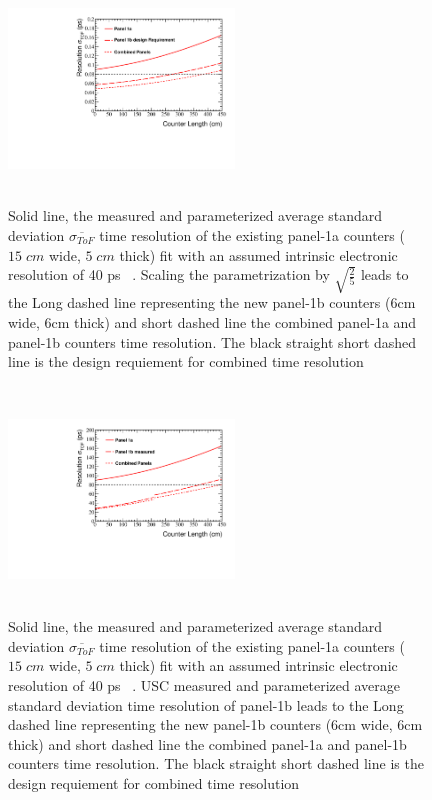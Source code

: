 \begin{figure}[h!]
\centerline{\includegraphics[width=6cm,height=6cm]{evan/fig_evan_ftof_requirements/c1_design.pdf}}
\caption{Solid line, the measured and parameterized average standard deviation $\overline{\sigma_{ToF}}$ time resolution of the existing panel-1a counters ($15\;cm$ wide, $5\;cm$ thick) fit with an assumed intrinsic electronic resolution of 40 ps ~\cite{smith1999time}. Scaling the parametrization by $\sqrt{\frac{2}{5}}$ leads to the  Long dashed line representing the new panel-1b counters (6cm wide, 6cm thick) and short dashed line the combined panel-1a and panel-1b counters time resolution. The black straight short dashed line is the design requiement for combined time resolution}
\label{fig:Design}
\end{figure}

\begin{figure}[h!]
\centerline{\includegraphics[width=6cm,height=6cm]{evan/fig_evan_ftof_requirements/c1_real.pdf}}
\caption{Solid line, the measured and parameterized average standard deviation $\overline{\sigma_{ToF}}$ time resolution of the existing panel-1a counters ($15\;cm$ wide, $5\;cm$ thick) fit with an assumed intrinsic electronic resolution of 40 ps ~\cite{smith1999time}. USC measured and parameterized average standard deviation time resolution of panel-1b leads to the  Long dashed line representing the new panel-1b counters (6cm wide, 6cm thick) and short dashed line the combined panel-1a and panel-1b counters time resolution. The black straight short dashed line is the design requiement for combined time resolution}
\label{fig:real}
\end{figure}



